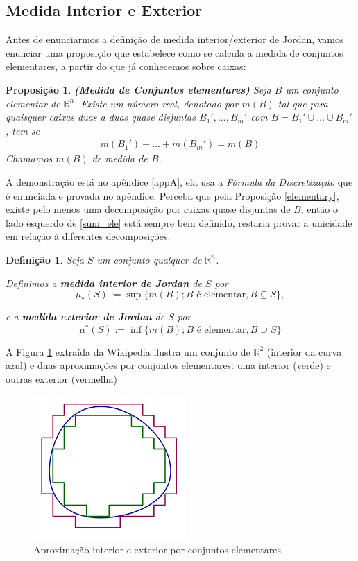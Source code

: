 \documentclass[12pt,letterpaper]{article}
\newtheorem{proposition}{Proposição}
\newtheorem{defi}{Definição}
\newcommand{\rr}{\mathbb{R}^2}
\newcommand{\rn}{\mathbb{R}^n}
\begin{document}
	\subsection{Medida Interior e Exterior}
	
	Antes de enunciarmos a definição de medida interior/exterior de Jordan, vamos enunciar uma proposição que estabelece como se calcula a medida de conjuntos elementares, a partir do que já conhecemos sobre caixas:
	
	\begin{proposition}
		\label{elementary_masure}\textbf{(Medida de Conjuntos elementares)} Seja $B$ um conjunto elementar de $\rn$. Existe um número real, denotado por $m(B)$ tal que para quaisquer caixas duas a duas quase disjuntas $B_1',\ldots ,B_m'$ com $B=B_1'\cup\ldots\cup B_m'$, tem-se
		\begin{align}m(B_1')+\ldots+m(B_m')=m(B)\label{sum_ele}\end{align}
		Chamamos $m(B)$ de medida de $B$.
	\end{proposition}
	A demonstração está no apêndice \ref{appA}, ela usa a \textit{Fórmula da Discretização} que é enunciada e provada no apêndice. Perceba que pela Proposição \ref{elementary}, existe pelo menos uma decomposição por caixas quase disjuntas de $B$, então o lado esquerdo de \ref{sum_ele} está sempre bem definido, restaria provar a unicidade em relação à diferentes decomposições.
	
	\begin{defi}\label{inner_outer}
		Seja $S$ um conjunto qualquer de $\rn$.
		
		Definimos a \textbf{medida interior de Jordan} de $S$ por
		$$\mu_{*}(S):=\sup\{m(B);B\text{ é elementar},B\subseteq S\},$$
		
		e a \textbf{medida exterior de Jordan} de $S$ por
		$$\mu^{*}(S):=\inf\{m(B);B\text{ é elementar},B\supseteq S\}$$
	\end{defi}

 A Figura \ref{jordanwiki} extraída da Wikipedia\cite{wiki:Jordan_measure} ilustra um conjunto de $\rr$ (interior da curva azul) e duas aproximações por conjuntos elementares: uma interior (verde) e outras exterior (vermelha)
 \begin{figure}[!htb]
 	\centering
 	\includegraphics[scale=0.7]{../images/jordan_wiki.png}
 	\caption{Aproximação interior e exterior por conjuntos elementares}
 	\label{jordanwiki}
 \end{figure}
\end{document}
